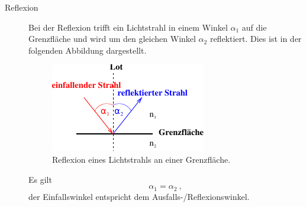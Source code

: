 \begin{description}
    \item[Reflexion] 
    Bei der Reflexion trifft ein Lichtstrahl in einem Winkel $\alpha_1$ auf die Grenzfläche und wird um den gleichen Winkel $\alpha_2$ reflektiert.
    Dies ist in der folgenden Abbildung dargestellt.
    \begin{figure}[H]
       \centering
        \includegraphics[scale=1]{content/img/Abb_2a.pdf}
        \caption{Reflexion eines Lichtstrahls an einer Grenzfläche.}
        \label{fig:reflexion}
    \end{figure}
    Es gilt 
    \begin{equation}
        \alpha_1 = \alpha_2 \ , 
    \end{equation}
    der Einfallswinkel entspricht dem Ausfalls-/Reflexionswinkel.


\end{description}
